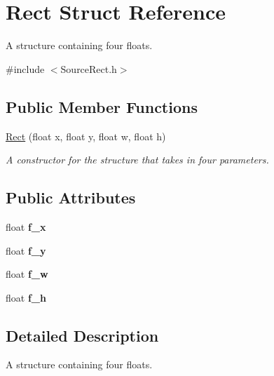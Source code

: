 \hypertarget{struct_rect}{\section{Rect Struct Reference}
\label{struct_rect}
}


A structure containing four floats.  




{\ttfamily \#include $<$Source\+Rect.\+h$>$}

\subsection*{Public Member Functions}
\begin{DoxyCompactItemize}
\item 
\hyperlink{struct_rect_a21e3f21b1579b6aea19ea88d89c019ef}{Rect} (float x, float y, float w, float h)
\begin{DoxyCompactList}\small\item\em A constructor for the structure that takes in four parameters. \end{DoxyCompactList}\end{DoxyCompactItemize}
\subsection*{Public Attributes}
\begin{DoxyCompactItemize}
\item 
\hypertarget{struct_rect_afbb60a370ff89951ddad6ff377e75a94}{float {\bfseries f\+\_\+x}}\label{struct_rect_afbb60a370ff89951ddad6ff377e75a94}

\item 
\hypertarget{struct_rect_a12b49f1cb04bf92f77dde91f53bf99d8}{float {\bfseries f\+\_\+y}}\label{struct_rect_a12b49f1cb04bf92f77dde91f53bf99d8}

\item 
\hypertarget{struct_rect_a6cc260d7e6d6fd07514cd88ac785e0f6}{float {\bfseries f\+\_\+w}}\label{struct_rect_a6cc260d7e6d6fd07514cd88ac785e0f6}

\item 
\hypertarget{struct_rect_a784fe78544bcb8705e652d3a8eaa4a86}{float {\bfseries f\+\_\+h}}\label{struct_rect_a784fe78544bcb8705e652d3a8eaa4a86}

\end{DoxyCompactItemize}


\subsection{Detailed Description}
A structure containing four floats. 

